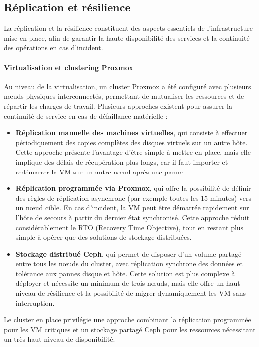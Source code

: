 \subsection{Réplication et résilience}

La réplication et la résilience constituent des aspects essentiels de l’infrastructure mise en place, afin de garantir la haute disponibilité des services et la continuité des opérations en cas d’incident.

\paragraph{Virtualisation et clustering Proxmox}
Au niveau de la virtualisation, un cluster Proxmox a été configuré avec plusieurs nœuds physiques interconnectés, permettant de mutualiser les ressources et de répartir les charges de travail. Plusieurs approches existent pour assurer la continuité de service en cas de défaillance matérielle :

\begin{itemize}
	\item \textbf{Réplication manuelle des machines virtuelles}, qui consiste à effectuer périodiquement des copies complètes des disques virtuels sur un autre hôte. Cette approche présente l’avantage d’être simple à mettre en place, mais elle implique des délais de récupération plus longs, car il faut importer et redémarrer la VM sur un autre nœud après une panne.
	\item \textbf{Réplication programmée via Proxmox}, qui offre la possibilité de définir des règles de réplication asynchrone (par exemple toutes les 15 minutes) vers un nœud cible. En cas d’incident, la VM peut être démarrée rapidement sur l’hôte de secours à partir du dernier état synchronisé. Cette approche réduit considérablement le RTO (Recovery Time Objective), tout en restant plus simple à opérer que des solutions de stockage distribuées.
	\item \textbf{Stockage distribué Ceph}, qui permet de disposer d’un volume partagé entre tous les nœuds du cluster, avec réplication synchrone des données et tolérance aux pannes disque et hôte. Cette solution est plus complexe à déployer et nécessite un minimum de trois nœuds, mais elle offre un haut niveau de résilience et la possibilité de migrer dynamiquement les VM sans interruption.
\end{itemize}

Le cluster en place privilégie une approche combinant la réplication programmée pour les VM critiques et un stockage partagé Ceph pour les ressources nécessitant un très haut niveau de disponibilité.

